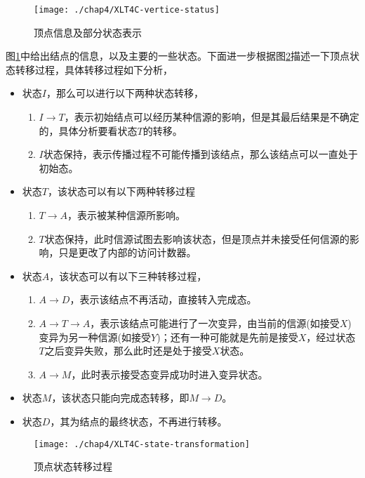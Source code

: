 \begin{figure}[H]
	\centering%
	\texttt{[image: ./chap4/XLT4C-vertice-status]}
	\caption{顶点信息及部分状态表示}
	\label{fig:chap4:vertice-status}
\end{figure}


图\ref{fig:chap4:vertice-status}中给出结点的信息，以及主要的一些状态。下面进一步根据图\ref{fig:chap4:state-xformation}描述一下顶点状态转移过程，具体转移过程如下分析，
\begin{itemize}
\item 状态$I$，那么可以进行以下两种状态转移，
	\begin{enumerate}
	\item $I \rightarrow T$，表示初始结点可以经历某种信源的影响，但是其最后结果是不确定的，具体分析要看状态$T$的转移。
	\item $I$状态保持，表示传播过程不可能传播到该结点，那么该结点可以一直处于初始态。
	\end{enumerate}
\item 状态$T$，该状态可以有以下两种转移过程
	\begin{enumerate}
	\item $T \rightarrow A$，表示被某种信源所影响。
	\item $T$状态保持，此时信源试图去影响该状态，但是顶点并未接受任何信源的影响，只是更改了内部的访问计数器。
	\end{enumerate}
\item 状态$A$，该状态可以有以下三种转移过程，
	\begin{enumerate}
	\item $A \rightarrow D$，表示该结点不再活动，直接转入完成态。
	\item $A \rightarrow T \rightarrow A$，表示该结点可能进行了一次变异，由当前的信源(如接受$X$)变异为另一种信源(如接受$Y$)；还有一种可能就是先前是接受$X$，经过状态$T$之后变异失败，那么此时还是处于接受$X$状态。
	\item $A \rightarrow M$，此时表示接受态变异成功时进入变异状态。
	\end{enumerate}
\item 状态$M$，该状态只能向完成态转移，即$M \rightarrow D$。
\item 状态$D$，其为结点的最终状态，不再进行转移。
\end{itemize}

\begin{figure}[H]
	\centering%
	\texttt{[image: ./chap4/XLT4C-state-transformation]}
	\caption{顶点状态转移过程}
	\label{fig:chap4:state-xformation}
\end{figure}


